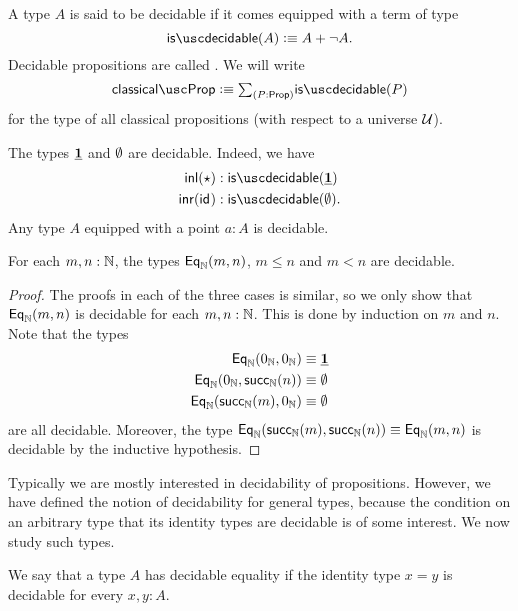 \begin{defn}
  A type $A$ is said to be decidable if it comes equipped with a term of type
  \begin{equation*}
    \isdecidable(A)\defeq A+\neg A.
  \end{equation*}
  Decidable propositions are called . We will write
  \begin{equation*}
    \classicalprop \defeq \sm{P:\prop}\isdecidable(P)
  \end{equation*}
  for the type of all classical propositions (with respect to a universe $\mathcal{U}$).
\end{defn}

\begin{eg}
  The types $\underline{\mathbf{1}}$ and $\emptyset$ are decidable. Indeed, we have
  \begin{align*}
    \inl(\ttt) & :\isdecidable(\unit) \\
    \inr(\idfunc) & : \isdecidable(\emptyt).\qedhere
  \end{align*}
  Any type $A$ equipped with a point $a:A$ is decidable.
\end{eg}

\begin{lem}
  For each $m,n:{\mathbb{N}}$, the types $\mathsf{Eq}_{{\mathbb{N}}}(m,n)$, $m\leq n$ and $m<n$ are decidable.
\end{lem}

\begin{proof}
  The proofs in each of the three cases is similar, so we only show that $\mathsf{Eq}_{{\mathbb{N}}}(m,n)$ is decidable for each $m,n:{\mathbb{N}}$. This is done by induction on $m$ and $n$. Note that the types
  \begin{align*}
    \mathsf{Eq}_{{\mathbb{N}}}(0_{{\mathbb{N}}},0_{{\mathbb{N}}}) & \equiv \underline{\mathbf{1}} \\
    \mathsf{Eq}_{{\mathbb{N}}}(0_{{\mathbb{N}}},\mathsf{succ}_{{\mathbb{N}}}(n)) & \equiv \emptyset \\
    \mathsf{Eq}_{{\mathbb{N}}}(\mathsf{succ}_{{\mathbb{N}}}(m),0_{{\mathbb{N}}}) & \equiv \emptyset 
  \end{align*}
  are all decidable. Moreover, the type $\mathsf{Eq}_{{\mathbb{N}}}(\mathsf{succ}_{{\mathbb{N}}}(m),\mathsf{succ}_{{\mathbb{N}}}(n))\equiv \mathsf{Eq}_{{\mathbb{N}}}(m,n)$ is decidable by the inductive hypothesis.
\end{proof}

Typically we are mostly interested in decidability of propositions. However, we have defined the notion of decidability for general types, because the condition on an arbitrary type that its identity types are decidable is of some interest. We now study such types.

\begin{defn}
  We say that a type $A$ has decidable equality if the identity type $x=y$ is decidable for every $x,y:A$. 
\end{defn}

